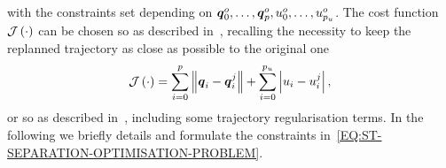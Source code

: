with the constraints set depending on $\boldsymbol{q}^o_0, \dots, \boldsymbol{q}^o_{p}, u^o_0, \dots, u^o_{p_{u}}$.
The cost function $\mathcal{J} \left( \cdot \right)$ can be chosen so as described in~, recalling the
necessity to keep the replanned trajectory as close as possible to the original one
\begin{equation}%
    \label{EQ:ST-BEZIER-LOSS}
    \loss \lp \cdot \rp = \sum_{i=0}^{\order} \norm{\bs{\cpoint}_i - \bs{\cpoint}^j_i} + \sum_{i=0}^{\order_{\splinevar}} \lb \splinevar_i - \splinevar^j_i \rb,
\end{equation}
or so as described in~, including some trajectory regularisation terms.
In the following we briefly details and formulate the constraints in~\eqref{EQ:ST-SEPARATION-OPTIMISATION-PROBLEM}.
